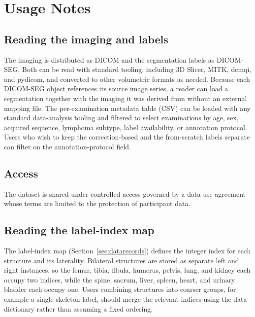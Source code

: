 
\section*{Usage Notes}\label{sec:usage}

\subsection*{Reading the imaging and labels}\label{subsec:reading}
The imaging is distributed as DICOM and the segmentation labels as DICOM-SEG.
Both can be read with standard tooling, including 3D Slicer, MITK, dcmqi, and pydicom, and converted to other volumetric formats as needed.
Because each DICOM-SEG object references its source image series, a reader can load a segmentation together with the imaging it was derived from without an external mapping file.
The per-examination metadata table (CSV) can be loaded with any standard data-analysis tooling and filtered to select examinations by age, sex, acquired sequence, lymphoma subtype, label availability, or annotation protocol.
Users who wish to keep the correction-based and the from-scratch labels separate can filter on the annotation-protocol field.

\subsection*{Access}\label{subsec:access}
The dataset is shared under controlled access governed by a data use agreement whose terms are limited to the protection of participant data.

\subsection*{Reading the label-index map}\label{subsec:labelmap}
The label-index map (Section~\ref{sec:datarecords}) defines the integer index for each structure and its laterality.
Bilateral structures are stored as separate left and right instances, so the femur, tibia, fibula, humerus, pelvis, lung, and kidney each occupy two indices, while the spine, sacrum, liver, spleen, heart, and urinary bladder each occupy one.
Users combining structures into coarser groups, for example a single skeleton label, should merge the relevant indices using the data dictionary rather than assuming a fixed ordering.

